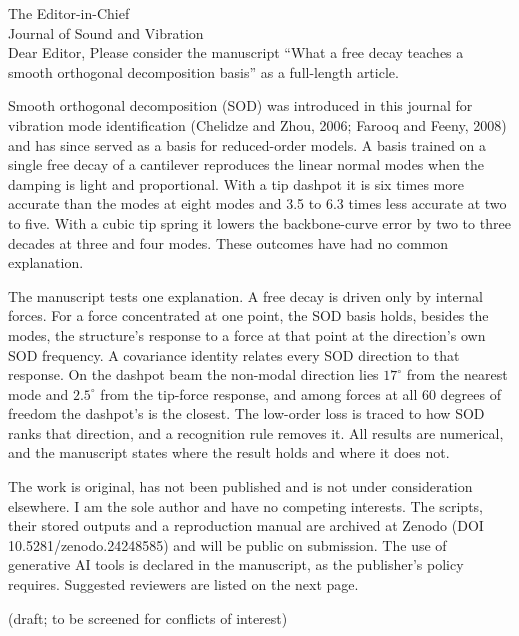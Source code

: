 \documentclass[letter]{nld}
\date{\today}
\begin{document}
\begin{nldletter}{The Editor-in-Chief\\ Journal of Sound and Vibration\\[1.2em] Dear Editor,}
Please consider the manuscript ``What a free decay teaches a smooth orthogonal decomposition basis'' as a full-length article.

Smooth orthogonal decomposition (SOD) was introduced in this journal for vibration mode identification (Chelidze and Zhou, 2006; Farooq and Feeny, 2008) and has since served as a basis for reduced-order models. A basis trained on a single free decay of a cantilever reproduces the linear normal modes when the damping is light and proportional. With a tip dashpot it is six times more accurate than the modes at eight modes and 3.5 to 6.3 times less accurate at two to five. With a cubic tip spring it lowers the backbone-curve error by two to three decades at three and four modes. These outcomes have had no common explanation.

The manuscript tests one explanation. A free decay is driven only by internal forces. For a force concentrated at one point, the SOD basis holds, besides the modes, the structure's response to a force at that point at the direction's own SOD frequency. A covariance identity relates every SOD direction to that response. On the dashpot beam the non-modal direction lies $17^\circ$ from the nearest mode and $2.5^\circ$ from the tip-force response, and among forces at all 60 degrees of freedom the dashpot's is the closest. The low-order loss is traced to how SOD ranks that direction, and a recognition rule removes it. All results are numerical, and the manuscript states where the result holds and where it does not.

The work is original, has not been published and is not under consideration elsewhere. I am the sole author and have no competing interests. The scripts, their stored outputs and a reproduction manual are archived at Zenodo (DOI 10.5281/zenodo.24248585) and will be public on submission. The use of generative AI tools is declared in the manuscript, as the publisher's policy requires.
Suggested reviewers are listed on the next page.
\end{nldletter}

\newpage
{} {\sffamily\small(draft; to be screened for conflicts of interest)}
\end{document}
